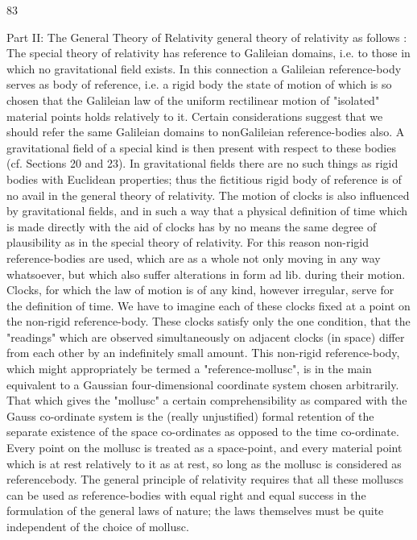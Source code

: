 \documentclass{article}
\begin{document}
83

Part II: The General Theory of Relativity
general theory of relativity as follows : The special theory of relativity has reference to
Galileian domains, i.e. to those in which no gravitational field exists. In this connection a
Galileian reference-body serves as body of reference, i.e. a rigid body the state of motion of
which is so chosen that the Galileian law of the uniform rectilinear motion of "isolated"
material points holds relatively to it.
Certain considerations suggest that we should refer the same Galileian domains to nonGalileian reference-bodies also. A gravitational field of a special kind is then present with
respect to these bodies (cf. Sections 20 and 23).
In gravitational fields there are no such things as rigid bodies with Euclidean properties;
thus the fictitious rigid body of reference is of no avail in the general theory of relativity.
The motion of clocks is also influenced by gravitational fields, and in such a way that a
physical definition of time which is made directly with the aid of clocks has by no means
the same degree of plausibility as in the special theory of relativity.
For this reason non-rigid reference-bodies are used, which are as a whole not only
moving in any way whatsoever, but which also suffer alterations in form ad lib. during their
motion. Clocks, for which the law of motion is of any kind, however irregular, serve for the
definition of time. We have to imagine each of these clocks fixed at a point on the non-rigid
reference-body. These clocks satisfy only the one condition, that the "readings" which are
observed simultaneously on adjacent clocks (in space) differ from each other by an
indefinitely small amount. This non-rigid reference-body, which might appropriately be
termed a "reference-mollusc", is in the main equivalent to a Gaussian four-dimensional coordinate system chosen arbitrarily. That which gives the "mollusc" a certain
comprehensibility as compared with the Gauss co-ordinate system is the (really unjustified)
formal retention of the separate existence of the space co-ordinates as opposed to the time
co-ordinate. Every point on the mollusc is treated as a space-point, and every material point
which is at rest relatively to it as at rest, so long as the mollusc is considered as referencebody. The general principle of relativity requires that all these molluscs can be used as
reference-bodies with equal right and equal success in the formulation of the general laws
of nature; the laws themselves must be quite independent of the choice of mollusc.
\end{document}
